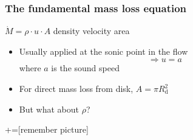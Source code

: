 \documentclass[presentation]{beamer}
\begin{document}
\begin{frame}\frametitle{The fundamental mass loss equation}
  {\huge \(
    \dot M = \rho \cdot u \cdot A
    \)\quad}
  \structure{$\rho$:} density\quad
   velocity\quad
   area
  \bigskip
  \begin{itemize}
  \item Usually applied at the sonic point in the flow
    \[ \Rightarrow u = a \]
    where $a$ is the sound speed
  \item For direct mass loss from disk, $A = \pi R_\mathrm{d}^2$
  \item But what about $\rho$?
  \end{itemize}
  
\end{frame}


+=[remember picture]
\everymath{\displaystyle}
\end{document}
